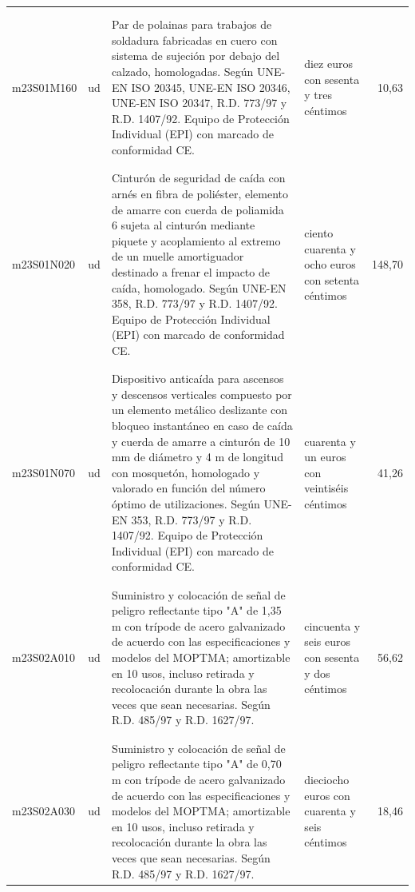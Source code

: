 \begin{supertabular}{|l|l|p{5cm}|p{3cm}|r|}
&&&&\\%
&&&&\\%
m23S01M160&ud&Par de polainas para trabajos de soldadura fabricadas en cuero con sistema de sujeción por debajo del calzado, homologadas. Según UNE{-}EN ISO 20345, UNE{-}EN ISO 20346, UNE{-}EN ISO 20347, R.D. 773/97 y R.D. 1407/92. Equipo de Protección Individual (EPI) con marcado de conformidad CE.&diez euros con sesenta y tres céntimos&10,63\\%
&&&&\\%
&&&&\\%
m23S01N020&ud&Cinturón de seguridad de caída con arnés en fibra de poliéster, elemento de amarre con cuerda de poliamida 6 sujeta al cinturón mediante piquete y acoplamiento al extremo de un muelle amortiguador destinado a frenar el impacto de caída, homologado. Según UNE{-}EN 358, R.D. 773/97 y R.D. 1407/92. Equipo de Protección Individual (EPI) con marcado de conformidad CE.&ciento cuarenta y ocho euros con setenta céntimos&148,70\\%
&&&&\\%
&&&&\\%
m23S01N070&ud&Dispositivo anticaída para ascensos y descensos verticales compuesto por un elemento metálico deslizante con bloqueo instantáneo en caso de caída y cuerda de amarre a cinturón de 10 mm de diámetro y 4 m de longitud con mosquetón, homologado y valorado en función del número óptimo de utilizaciones. Según UNE{-}EN 353, R.D. 773/97 y R.D. 1407/92. Equipo de Protección Individual (EPI) con marcado de conformidad CE.&cuarenta y un euros con veintiséis céntimos&41,26\\%
&&&&\\%
&&&&\\%
m23S02A010&ud&Suministro y colocación de señal de peligro reflectante tipo "A" de 1,35 m con trípode de acero galvanizado de acuerdo con las especificaciones y modelos del MOPTMA; amortizable en 10 usos, incluso retirada y recolocación durante la obra las veces que sean necesarias. Según R.D. 485/97 y R.D. 1627/97.&cincuenta y seis euros con sesenta y dos céntimos&56,62\\%
&&&&\\%
&&&&\\%
m23S02A030&ud&Suministro y colocación de señal de peligro reflectante tipo "A" de 0,70 m con trípode de acero galvanizado de acuerdo con las especificaciones y modelos del MOPTMA; amortizable en 10 usos, incluso retirada y recolocación durante la obra las veces que sean necesarias. Según R.D. 485/97 y R.D. 1627/97.&dieciocho euros con cuarenta y seis céntimos&18,46\\%

\end{supertabular}
